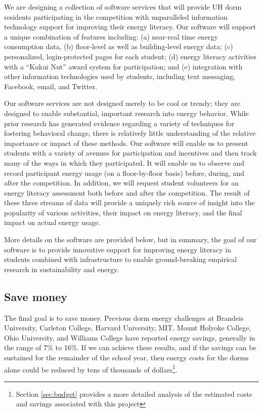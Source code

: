 \documentclass[11pt]{article}
\begin{document}
We are designing a collection of software services that will provide UH
dorm residents participating in the competition with unparalleled
information technology support for improving their energy literacy.  Our
software will support a unique combination of features including: (a)
near-real time energy consumption data, (b) floor-level as well as
building-level energy data; (c) personalized, login-protected pages for
each student; (d) energy literacy activities with a ``Kukui Nut'' award
system for participation; and (e) integration with other information
technologies used by students, including text messaging, Facebook, email,
and Twitter.

Our software services are not designed merely to be cool or trendy; they
are designed to enable substantial, important research into energy
behavior. While prior research has generated evidence regarding a variety
of techniques for fostering behavioral change, there is relatively little
understanding of the relative importance or impact of these methods.  Our
software will enable us to present students with a variety of avenues for
participation and incentives and then track many of the ways in which they
participated. It will enable us to observe and record participant energy
usage (on a floor-by-floor basis) before, during, and after the
competition.  In addition, we will request student volunteers for an energy
literacy assessment both before and after the competition.  The result of
these three streams of data will provide a uniquely rich source of insight
into the popularity of various activities, their impact on energy literacy,
and the final impact on actual energy usage.

More details on the software are provided below, but in summary, the goal
of our software is to provide innovative support for improving energy
literacy in students combined with infrastructure to enable ground-breaking
empirical research in sustainability and energy.

\subsection{Save money}

The final goal is to save money.  Previous dorm energy challenges at
Brandeis University, Carleton College, Harvard University, MIT, Mount
Holyoke College, Ohio University, and Williams College have reported energy
savings, generally in the range of 7\% to 16\%.  If we can achieve these
results, and if the savings can be sustained for the remainder of the
school year, then energy costs for the dorms alone could be reduced by tens
of thousands of dollars\footnote{Section \ref{sec:budget} provides a more
  detailed analysis of the estimated costs and savings associated with this
  project}.
\end{document}
